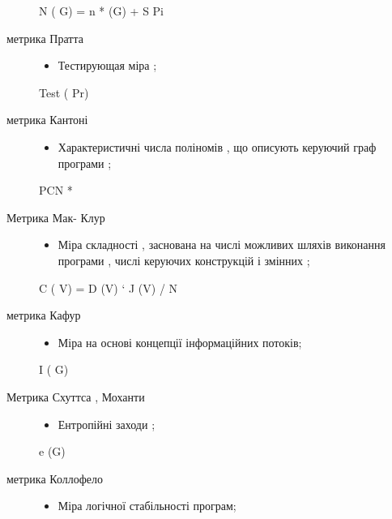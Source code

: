\begin{description}
\begin{itemize}
\end{itemize}

N ( G) = n * (G) + S Pi

\item[{метрика Пратта}] \leavevmode\begin{itemize}
\item {} 
Тестирующая міра ;

\end{itemize}

Test ( Pr)

\item[{метрика Кантоні}] \leavevmode\begin{itemize}
\item {} 
Характеристичні числа поліномів , що описують керуючий граф програми ;

\end{itemize}

PCN *

\item[{Метрика Мак- Клур}] \leavevmode\begin{itemize}
\item {} 
Міра складності , заснована на числі можливих шляхів виконання програми , числі керуючих конструкцій і змінних ;

\end{itemize}

C ( V) = D (V) ` J (V) / N

\item[{метрика Кафур}] \leavevmode\begin{itemize}
\item {} 
Міра на основі концепції інформаційних потоків;

\end{itemize}

I ( G)

\item[{Метрика Схуттса , Моханти}] \leavevmode\begin{itemize}
\item {} 
Ентропійні заходи ;

\end{itemize}

e (G)

\item[{метрика Коллофело}] \leavevmode\begin{itemize}
\item {} 
Міра логічної стабільності програм;

\end{itemize}


\end{description}
